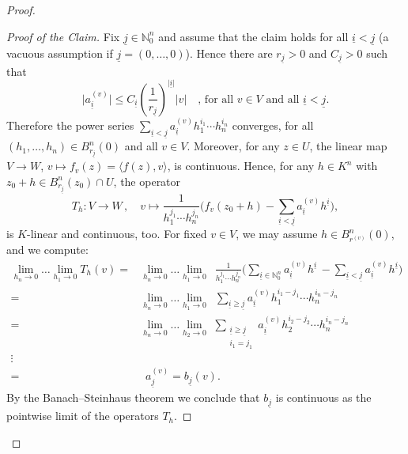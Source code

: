 \documentclass[a4paper, reqno, 10pt]{amsart}
\theoremstyle{definition}
\numberwithin{equation}{section}
\newcommand{\abs}[1]{{\lvert{#1}\rvert}}
\newcommand{\lra}{\longrightarrow}
\newcommand{\lto}{\longmapsto}
\newcommand{\mto}{\mapsto}
\newcommand{\ra}{\rightarrow}
\newcommand{\ul}[1]{{\underline{#1}}}
\newcommand{\BN}{{\mathbb {N}}}
\begin{document}
\begin{proof}
\begin{proof}[Proof of the Claim]
	Fix $\ul{j} \in \BN^n_0$ and assume that the claim holds for all $\ul{i}<\ul{j}$ (a vacuous assumption if $\ul{j}=(0,\ldots,0)$).
	Hence there are $r_\ul{j} >0$ and $C_\ul{j} >0$ such that
	\[\abs{a_\ul{i}^{(v)}} \leq C_\ul{i} \left(\frac{1}{r_\ul{j}}\right)^{\abs{\ul{i}}} \abs{v} \quad \text{, for all $v \in V$ and all $\ul{i}<\ul{j}$.} \]
	Therefore the power series $\sum_{\ul{i}<\ul{j}} a_\ul{i}^{(v)} h_1^{i_1}\cdots h_n^{i_n} $	converges, for all $(h_1,\ldots,h_n) \in B^{n}_{r_\ul{j}}(0)$ and all $v\in V$.
	Moreover, for any $z\in U$, the linear map $V \ra W$, $ v \mto f_v(z)=\langle f(z), v \rangle$, is continuous.	
	Hence, for any $h \in K^n$ with $z_0+h \in B^{n}_{r_\ul{j}}(z_0) \cap U$, the operator
	\begin{equation*}
		T_h \colon V \lra W \,,\quad  v \lto \frac{1}{h_1^{j_1}\cdots h_n^{j_n}} \bigg( f_v(z_0 + h) - \sum_{\ul{i}< \ul{j}} a_\ul{i}^{(v)} h^\ul{i} \bigg) ,
	\end{equation*}
	is $K$-linear and continuous, too.
	For fixed $v\in V$, we may assume $h \in B_{r^{(v)}}^{n}(0)$, and we compute:
	\begin{align*}
		\lim_{h_n\rightarrow 0}\ldots \lim_{h_1\rightarrow 0} T_h(v) =& \lim_{h_n\rightarrow 0}\ldots \lim_{h_1\rightarrow 0} \,\,\, \frac{1}{h_1^{j_1}\cdots h_n^{j_n}} \bigg( \sum_{\ul{i} \in \BN^n_0} a_\ul{i}^{(v)} h^\ul{i} \, - \sum_{\ul{i}< \ul{j}} a_\ul{i}^{(v)} h^\ul{i} \bigg) \\
		=& \lim_{h_n\rightarrow 0}\ldots \lim_{h_1\rightarrow 0} \,\,\, \sum_{\ul{i}\geq \ul{j}} a_\ul{i}^{(v)} h_1^{i_1-j_1}\cdots h_n^{i_n - j_n} \\
		=& \lim_{h_n\rightarrow 0}\ldots \lim_{h_2\rightarrow 0} \,\, \sum_{\substack{\ul{i}\geq \ul{j} \\ i_1 = j_1} } a_\ul{i}^{(v)} h_2^{i_2 - j_2}\cdots h_n^{i_n - j_n} \\[-18pt]
		\vdots& \\
		=& \,\,\, a_\ul{j}^{(v)} = b_{\ul{j}}(v)  .
	\end{align*}
	By the Banach--Steinhaus theorem \cite[III.\ \S 4.2 Cor.\ 2]{Bourbaki87TopVectSp1to5} we conclude that $b_\ul{j}$ is continuous as the pointwise limit of the operators $T_h$.
	

\end{proof}
\end{proof}
\end{document}
